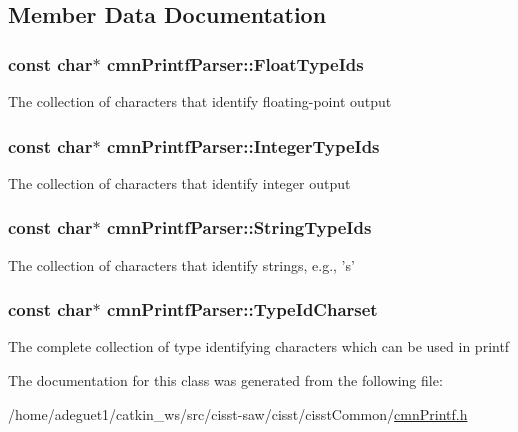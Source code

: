 \subsection{Member Data Documentation}
\hypertarget{classcmn_printf_parser_ad7f764cf8f7fbb64a10f1a817b417015}{
\subsubsection[{Float\-Type\-Ids}]{\setlength{\rightskip}{0pt plus 5cm}const char$\ast$ cmn\-Printf\-Parser\-::\-Float\-Type\-Ids\hspace{0.3cm}{\ttfamily [static]}}}\label{classcmn_printf_parser_ad7f764cf8f7fbb64a10f1a817b417015}
The collection of characters that identify floating-\/point output \hypertarget{classcmn_printf_parser_aa256066fc793a612014ac148e6f5c938}{
\subsubsection[{Integer\-Type\-Ids}]{\setlength{\rightskip}{0pt plus 5cm}const char$\ast$ cmn\-Printf\-Parser\-::\-Integer\-Type\-Ids\hspace{0.3cm}{\ttfamily [static]}}}\label{classcmn_printf_parser_aa256066fc793a612014ac148e6f5c938}
The collection of characters that identify integer output \hypertarget{classcmn_printf_parser_a44131161d46cb41973c04e59722332f1}{
\subsubsection[{String\-Type\-Ids}]{\setlength{\rightskip}{0pt plus 5cm}const char$\ast$ cmn\-Printf\-Parser\-::\-String\-Type\-Ids\hspace{0.3cm}{\ttfamily [static]}}}\label{classcmn_printf_parser_a44131161d46cb41973c04e59722332f1}
The collection of characters that identify strings, e.\-g., 's' \hypertarget{classcmn_printf_parser_aaa4ca685e67cabb8319f6c6e5b754517}{
\subsubsection[{Type\-Id\-Charset}]{\setlength{\rightskip}{0pt plus 5cm}const char$\ast$ cmn\-Printf\-Parser\-::\-Type\-Id\-Charset\hspace{0.3cm}{\ttfamily [static]}}}\label{classcmn_printf_parser_aaa4ca685e67cabb8319f6c6e5b754517}
The complete collection of type identifying characters which can be used in printf 

The documentation for this class was generated from the following file\-:\begin{DoxyCompactItemize}
\item 
/home/adeguet1/catkin\-\_\-ws/src/cisst-\/saw/cisst/cisst\-Common/\hyperlink{cmn_printf_8h}{cmn\-Printf.\-h}\end{DoxyCompactItemize}
